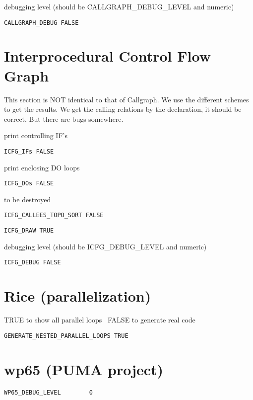 debugging level (should be CALLGRAPH_DEBUG_LEVEL and numeric)

\begin{verbatim}
CALLGRAPH_DEBUG FALSE
\end{verbatim}

\section{Interprocedural Control Flow Graph}
This section is NOT identical to that of Callgraph. 
We use the different schemes to get the results.
We get the calling relations by the declaration, it should be correct.
But there are bugs somewhere.

print controlling IF's

\begin{verbatim}
ICFG_IFs FALSE
\end{verbatim}

print enclosing DO loops

\begin{verbatim}
ICFG_DOs FALSE
\end{verbatim}

to be destroyed

\begin{verbatim}
ICFG_CALLEES_TOPO_SORT FALSE
\end{verbatim}

\begin{verbatim}
ICFG_DRAW TRUE
\end{verbatim}

debugging level (should be ICFG_DEBUG_LEVEL and numeric)

\begin{verbatim}
ICFG_DEBUG FALSE
\end{verbatim}

\section{Rice (parallelization)}

TRUE to show all parallel loops  \
FALSE to generate real code

\begin{verbatim}
GENERATE_NESTED_PARALLEL_LOOPS TRUE
\end{verbatim}

\section{wp65 (PUMA project)}

\begin{verbatim}
WP65_DEBUG_LEVEL        0
\end{verbatim}




